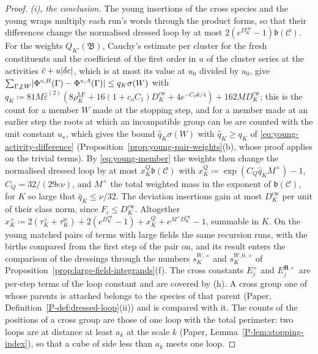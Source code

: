 \documentclass[11pt]{preprint}
\DeclarePairedDelimiter{\abs}{\lvert}{\rvert}
\numberwithin{equation}{section}
\theoremstyle{definition}
\theoremstyle{remark}
\theoremstyle{plain}
\begin{document}
\begin{proof}
\emph{(i), the conclusion.} The young insertions of the cross species and the young wraps multiply each run's words through the product forms, so that their differences change the normalised dressed loop by at most $2(e^{D^{\mathrm{cw}}_K} - 1)\mathfrak b(\mathcal C)$. For the weights $Q_{K'}(\mathfrak B)$, Cauchy's estimate per cluster for the fresh constituents and the coefficient of the first order in $u$ of the cluster series at the activities $\bar c + u\abs{\delta c}$, which is at most its value at $u_0$ divided by $u_0$, give $\sum_{\Gamma \not\perp W}\abs{\Phi^{\circ,B}(\Gamma) - \Phi^{\circ,A}(\Gamma)} \leq q_K\sigma(W)$ with $q_K \coloneqq 81M\hat\varepsilon^{(2)}(8\rho^{\mathrm{LF}}_K + 16(1 + c_oC_1)D^{\mathrm{cw}}_K + 4e^{-C_Pk/4}) + 162MD^{\mathrm{cw}}_K$; this is the count for a member $W$ made at the stopping step, and for a member made at an earlier step the roots at which an incompatible group can be are counted with the unit constant $u_\star$, which gives the bound $\hat q_K\sigma(W)$ with $\hat q_K \geq q_K$ of \eqref{eq:young-activity-difference} (Proposition~\ref{prop:young-pair-weights}(b), whose proof applies on the trivial terms). By \eqref{eq:young-member} the weights then change the normalised dressed loop by at most $x^Q_K\mathfrak b(\mathcal C)$ with $x^Q_K \coloneqq \exp(C_Q\hat q_KM^\times) - 1$, $C_Q = 32/(29e\nu)$, and $M^\times$ the total weighted mass in the exponent of $\mathfrak b(\mathcal C)$, for $K$ so large that $\hat q_K \leq \nu/32$. The deviation insertions gain at most $D^{\mathrm{cw}}_K$ per unit of their class norm, since $F_i \leq D^{\mathrm{cw}}_K$. Altogether $x^\times_K \coloneqq 2(\tau^\times_K + \tau^w_K) + 2(e^{D^{\mathrm{cw}}_K} - 1) + x^Q_K + e^{M^\times D^{\mathrm{cw}}_K} - 1$, summable in $K$. On the young matched pairs of terms with large fields the same recursion runs, with the births compared from the first step of the pair on, and its result enters the comparison of the dressings through the numbers $s^{W,\times}_K$ and $s^{W,0,\times}_K$ of Proposition~\ref{prop:large-field-integrands}(f). The cross constants $E^\times_j$ and $E^{\mathbf R\times}_j$ are per-step terms of the loop constant and are covered by (h). A cross group one of whose parents is attached belongs to the species of that parent (Paper, Definition~\ref{P-def:dressed-loop}(ii)) and is compared with it. The counts of the positions of a cross group are those of one loop with the total perimeter: two loops are at distance at least $a_k$ at the scale $k$ (Paper, Lemma~\ref{P-lem:stopping-index}), so that a cube of side less than $a_k$ meets one loop.
\end{proof}
\end{document}
